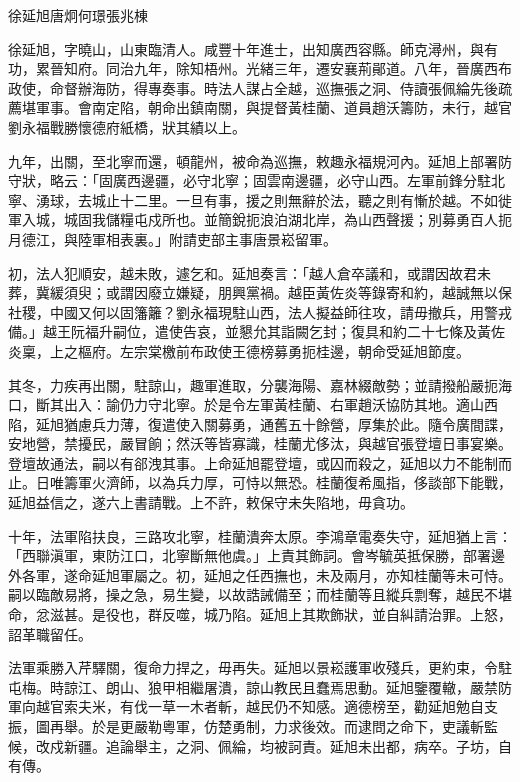 
\begin{pinyinscope}
徐延旭唐炯何璟張兆棟

徐延旭，字曉山，山東臨清人。咸豐十年進士，出知廣西容縣。師克潯州，與有功，累晉知府。同治九年，除知梧州。光緒三年，遷安襄荊鄖道。八年，晉廣西布政使，命督辦海防，得專奏事。時法人謀占全越，巡撫張之洞、侍讀張佩綸先後疏薦堪軍事。會南定陷，朝命出鎮南關，與提督黃桂蘭、道員趙沃籌防，未行，越官劉永福戰勝懷德府紙橋，狀其績以上。

九年，出關，至北寧而還，頓龍州，被命為巡撫，敕趣永福規河內。延旭上部署防守狀，略云：「固廣西邊疆，必守北寧；固雲南邊疆，必守山西。左軍前鋒分駐北寧、湧球，去城止十二里。一旦有事，援之則無辭於法，聽之則有慚於越。不如徙軍入城，城固我儲糧屯戍所也。並簡銳扼浪泊湖北岸，為山西聲援；別募勇百人扼月德江，與陸軍相表裏。」附請吏部主事唐景崧留軍。

初，法人犯順安，越未敗，遽乞和。延旭奏言：「越人倉卒議和，或謂因故君未葬，冀緩須臾；或謂因廢立嫌疑，朋興黨禍。越臣黃佐炎等錄寄和約，越誠無以保社稷，中國又何以固籓籬？劉永福現駐山西，法人擬益師往攻，請毋撤兵，用警戎備。」越王阮福升嗣位，遣使告哀，並懇允其詣闕乞封；復具和約二十七條及黃佐炎稟，上之樞府。左宗棠檄前布政使王德榜募勇扼桂邊，朝命受延旭節度。

其冬，力疾再出關，駐諒山，趣軍進取，分襲海陽、嘉林綴敵勢；並請撥船嚴扼海口，斷其出入：諭仍力守北寧。於是令左軍黃桂蘭、右軍趙沃協防其地。適山西陷，延旭猶慮兵力薄，復遣使入關募勇，通舊五十餘營，厚集於此。隨令廣間諜，安地營，禁擾民，嚴冒餉；然沃等皆寡識，桂蘭尤侈汰，與越官張登壇日事宴樂。登壇故通法，嗣以有郤洩其事。上命延旭罷登壇，或囚而殺之，延旭以力不能制而止。日唯籌軍火濟師，以為兵力厚，可恃以無恐。桂蘭復希風指，侈談部下能戰，延旭益信之，遂六上書請戰。上不許，敕保守未失陷地，毋貪功。

十年，法軍陷扶良，三路攻北寧，桂蘭潰奔太原。李鴻章電奏失守，延旭猶上言：「西聯滇軍，東防江口，北寧斷無他虞。」上責其飾詞。會岑毓英抵保勝，部署邊外各軍，遂命延旭軍屬之。初，延旭之任西撫也，未及兩月，亦知桂蘭等未可恃。嗣以臨敵易將，操之急，易生變，以故誥誡備至；而桂蘭等且縱兵剽奪，越民不堪命，忿滋甚。是役也，群反噬，城乃陷。延旭上其欺飾狀，並自糾請治罪。上怒，詔革職留任。

法軍乘勝入芹驛關，復命力捍之，毋再失。延旭以景崧護軍收殘兵，更約束，令駐屯梅。時諒江、朗山、狼甲相繼屠潰，諒山教民且蠢焉思動。延旭鑒覆轍，嚴禁防軍向越官索夫米，有伐一草一木者斬，越民仍不知感。適德榜至，勸延旭勉自支振，圖再舉。於是更嚴勒粵軍，仿楚勇制，力求後效。而逮問之命下，吏議斬監候，改戍新疆。追論舉主，之洞、佩綸，均被訶責。延旭未出都，病卒。子坊，自有傳。


\end{pinyinscope}
